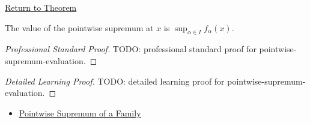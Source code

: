 \newpage
{}
\label{prf:pointwise-supremum-evaluation}

\begin{remark*}[Return]
\hyperref[thm:pointwise-supremum-evaluation]{Return to Theorem}
\end{remark*}

\begin{theorem*}
The value of the pointwise supremum at \(x\) is \(\sup_{\alpha\in I}f_\alpha(x)\).
\end{theorem*}

\begin{proof}[Professional Standard Proof]
\LRAProofBodyStart
TODO: professional standard proof for pointwise-supremum-evaluation.
\end{proof}

\begin{proof}[Detailed Learning Proof]
\LRAProofBodyStart
TODO: detailed learning proof for pointwise-supremum-evaluation.
\end{proof}

\begin{remark*}
\end{remark*}

\begin{dependencies}
\begin{itemize}
  \item \hyperref[def:pointwise-supremum-family]{Pointwise Supremum of a Family}
\end{itemize}
\end{dependencies}

\clearpage
